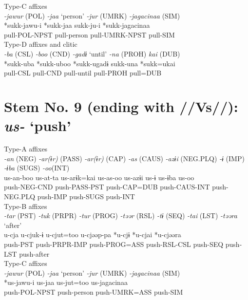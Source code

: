 \ex Type-C affixes\\
\glll \textit{-jawur} (POL)  \textit{-jaa} ‘person’  \textit{-jur} (UMRK)  \textit{-jagacinaa} (SIM)\\
*sukk-jawu-i  *sukk-jaa  sukk-ju-i  *sukk-jagacinaa\\
pull-POL-NPST  pull-person  pull-UMRK-NPST  pull-SIM\\


\ex Type-D affixes and clitic\\
\glll \textit{-ba} (CSL)  \textit{-boo} (CND)  \textit{-gadɨ} ‘until’  \textit{-na} (PROH)  \textit{kai} (DUB)\\
*sukk-uba  *sukk-uboo  *sukk-ugadɨ  sukk-una  *sukk=ukai\\
pull-CSL  pull-CND  pull-until  pull-PROH  pull=DUB\\
\z

\section{Stem No. 9 (ending with //Vs//): \textit{us-} ‘push’}

\ea Type-A affixes\\
\glll \textit{-an} (NEG)  \textit{-ar(ɨr)} (PASS)  \textit{-ar(ɨr)} (CAP)  \textit{-as} (CAUS)  \textit{-azɨi} (NEG.PLQ)  \textit{-ɨ} (IMP)  \textit{-ɨba} (SUGS)  \textit{-oo}(INT)\\
us-an-boo  us-at-ta  us-arɨk=kai  us-as-oo  us-azɨi  us-ɨ  us-ɨba  us-oo\\
push-NEG-CND  push-PASS-PST  push-CAP=DUB  push-CAUS-INT  push-NEG.PLQ  push-IMP  push-SUGS  push-INT\\


\ex Type-B affixes\\
\glll \textit{-tar} (PST)  \textit{-tuk} (PRPR)  \textit{-tur} (PROG)  \textit{-təər} (RSL)  \textit{-tɨ} (SEQ)  \textit{-tai} (LST)  \textit{-təəra} ‘after’\\
u-cja  u-cjuk-ɨ  u-cjut=too  u-cjəəp-pa  *u-cjɨ  *u-cjai  *u-cjəəra\\
push-PST  push-PRPR-IMP  push-PROG=ASS  push-RSL-CSL  push-SEQ  push-LST  push-after\\


\ex Type-C affixes\\
\glll \textit{-jawur} (POL)  \textit{-jaa} ‘person’  \textit{-jur} (UMRK)  \textit{-jagacinaa} (SIM)\\
*us-jawu-i  us-jaa  us-jut=too  us-jagacinaa\\
push-POL-NPST  push-person  push-UMRK=ASS  push-SIM\\


